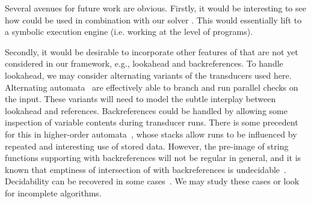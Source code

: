 

%

Several avenues for future work are obvious. Firstly, it would be interesting to
see how \expose{} could be used in combination with our solver \ostrich{}. This
would essentially lift \ostrich{} to a symbolic execution engine (i.e. working
at the level of programs).

Secondly, it would be desirable to incorporate other features of \regexp{} that
are not yet considered in our framework, e.g., lookahead and backreferences.
To handle lookahead, we may consider alternating variants of the transducers used here.
Alternating automata~\cite{CKS81} are effectively able to branch and run parallel checks on the input.
These variants will need to model the subtle interplay between lookahead and references.
Backreferences could be handled by allowing some inspection of variable contents during transducer runs.
There is some precedent for this in higher-order automata~\cite{M76,E91}, whose stacks allow runs to be influenced by repeated and interesting use of stored data.
However, the pre-image of string functions supporting \regexp{} with backreferences will not be regular in general, and it is known that emptiness of intersection of \regexp{} with backreferences is undecidable~\cite{CN09}.
Decidability can be recovered in some cases~\cite{FS19}.
We may study these cases or look for incomplete algorithms.

